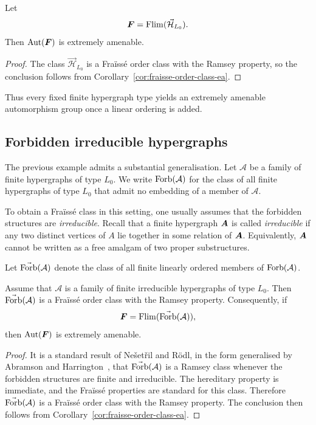 \begin{theorem}
    \label{thm:ordered-hypergraph-ea}
    Let
    \[
        \boldsymbol{F}=\operatorname{Flim}(\vec{\mathcal H}_{L_0}).
    \]
    Then \(\operatorname{Aut}(\boldsymbol{F})\) is extremely amenable.
\end{theorem}

\begin{proof}
    The class \(\vec{\mathcal H}_{L_0}\) is a Fraïssé order class with the Ramsey property, so the conclusion follows from Corollary~\ref{cor:fraisse-order-class-ea}.
\end{proof}

Thus every fixed finite hypergraph type yields an extremely amenable automorphism group once a linear ordering is added.

\subsection{Forbidden irreducible hypergraphs}

The previous example admits a substantial generalisation. Let \(\mathcal A\) be a family of finite hypergraphs of type \(L_0\). We write \(\operatorname{Forb}(\mathcal A)\) for the class of all finite hypergraphs of type \(L_0\) that admit no embedding of a member of \(\mathcal A\).

To obtain a Fraïssé class in this setting, one usually assumes that the forbidden structures are \emph{irreducible}. Recall that a finite hypergraph \(\boldsymbol{A}\) is called \emph{irreducible} if any two distinct vertices of \(A\) lie together in some relation of \(\boldsymbol{A}\). Equivalently, \(\boldsymbol{A}\) cannot be written as a free amalgam of two proper substructures.

Let \(\vec{\operatorname{Forb}}(\mathcal A)\) denote the class of all finite linearly ordered members of \(\operatorname{Forb}(\mathcal A)\).

\begin{theorem}
    \label{thm:forb-irreducible-hypergraph-ea}
    Assume that \(\mathcal A\) is a family of finite irreducible hypergraphs of type \(L_0\). Then \(\vec{\operatorname{Forb}}(\mathcal A)\) is a Fraïssé order class with the Ramsey property. Consequently, if
    \[
        \boldsymbol{F}=\operatorname{Flim}(\vec{\operatorname{Forb}}(\mathcal A)),
    \]
    then \(\operatorname{Aut}(\boldsymbol{F})\) is extremely amenable.
\end{theorem}

\begin{proof}
    It is a standard result of Ne\v{s}et\v{r}il and R\"odl, in the form generalised by Abramson and Harrington~\cite{AH78}, that \(\vec{\operatorname{Forb}}(\mathcal A)\) is a Ramsey class whenever the forbidden structures are finite and irreducible. The hereditary property is immediate, and the Fraïssé properties are standard for this class. Therefore \(\vec{\operatorname{Forb}}(\mathcal A)\) is a Fraïssé order class with the Ramsey property. The conclusion then follows from Corollary~\ref{cor:fraisse-order-class-ea}.
\end{proof}

